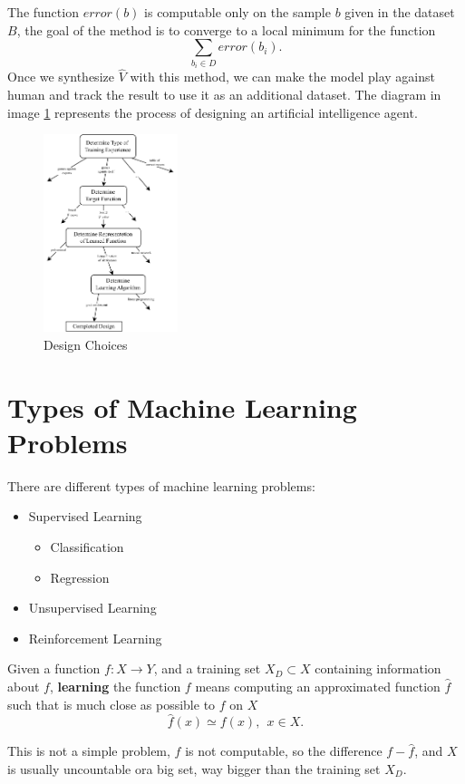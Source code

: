 \documentclass[10pt, letterpaper]{report}
\begin{document}
The function $error(b)$ is computable only on the sample $b$ given in the dataset $B$, the goal of the method is to converge to a local minimum for the function  \begin{equation}
    \sum_{b_i\in D}error(b_i).
\end{equation}
Once we synthesize $\hat V$ with this method, we can make the model play against human and track the result to use it as an additional dataset. The diagram in image \ref{img:DesignChoice} represents the process of designing an artificial intelligence agent.

\begin{figure}[h!]
    \centering
    \includegraphics[width=0.35\textwidth]{images/DesignChoice.pdf}
    \caption{Design Choices}
    \label{img:DesignChoice}
\end{figure}
\section{Types of Machine Learning Problems}
There are different types of machine learning problems:\begin{itemize}
    \item Supervised Learning\begin{itemize}
        \item Classification
        \item Regression
    \end{itemize}
    \item Unsupervised Learning
    \item Reinforcement Learning
\end{itemize}

\begin{definition}
    Given a function $f:X\rightarrow Y$, and a training set $X_D\subset X$ containing information about $f$, \textbf{learning} the function $f$ means computing an approximated function $\hat f$ such that is much close as possible to $f$ on $X$\begin{equation}
        \hat f(x)\simeq f(x), \ \ x\in X.
    \end{equation}
\end{definition}
This is not a simple problem, $f$ is not computable, so the difference $f-\hat f$, and $X$ is usually uncountable ora big set, way bigger than the training set $X_D$. \bigskip
\end{document}
